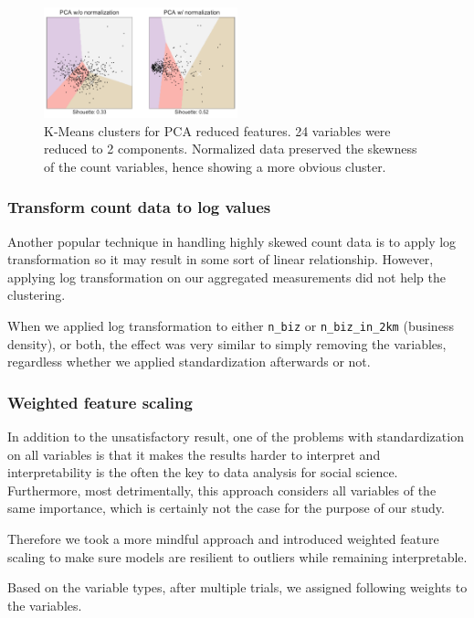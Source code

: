 \documentclass[compsoc]{IEEEtran}
\let\MYoriglatexcaption\caption
\renewcommand{\caption}[2][\relax]{\MYoriglatexcaption[#2]{#2}}
\begin{document}
\begin{figure}[h]
  \hspace{-.5em}
    \includegraphics[width=0.5\textwidth]{nbh-pca}
  \caption{K-Means clusters for PCA reduced features. 24 variables were reduced to 2 components. Normalized data preserved the skewness of the count variables, hence showing a more obvious cluster.}
  \label{nbh-pca}
\end{figure}

\subsubsection{Transform count data to log values}

Another popular technique in handling highly skewed count data is to apply log transformation so it may result in some sort of linear relationship. However, applying log transformation on our aggregated measurements did not help the clustering.

When we applied log transformation to either \texttt{n\_biz} or \texttt{n\_biz\_in\_2km} (business density), or both, the effect was very similar to simply removing the variables, regardless whether we applied standardization afterwards or not.

\subsubsection{Weighted feature scaling}

In addition to the unsatisfactory result, one of the problems with standardization on all variables is that it makes the results harder to interpret and interpretability is the often the key to data analysis for social science. Furthermore, most detrimentally, this approach considers all variables of the same importance, which is certainly not the case for the purpose of our study.

Therefore we took a more mindful approach and introduced weighted feature scaling to make sure models are resilient to outliers while remaining interpretable.

Based on the variable types, after multiple trials, we assigned following weights to the variables.
\end{document}
